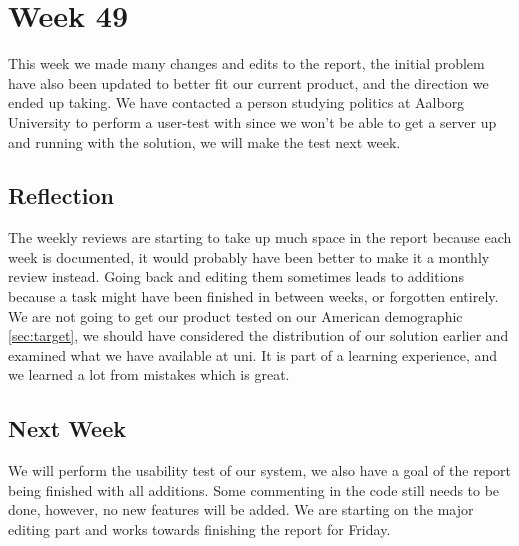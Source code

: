 \section*{Week 49}
This week we made many changes and edits to the report, the initial problem have
also been updated to better fit our current product, and the direction we ended
up taking. We have contacted a person studying politics at Aalborg University to
perform a user-test with since we won't be able to get a server up and running
with the solution, we will make the test next week.

\subsection*{Reflection}
The weekly reviews are starting to take up much space in the report because each
week is documented, it would probably have been better to make it a monthly
review instead. Going back and editing them sometimes leads to additions because
a task might have been finished in between weeks, or forgotten entirely. We are
not going to get our product tested on our American demographic
\autoref{sec:target}, we should have considered the distribution of our solution
earlier and examined what we have available at uni. It is part of a learning
experience, and we learned a lot from mistakes which is great.


\subsection*{Next Week}
We will perform the usability test of our system, we also have a goal of the
report being finished with all additions. Some commenting in the code still
needs to be done, however, no new features will be added. We are starting on the
major editing part and works towards finishing the report for Friday.



% 
% 
% 
